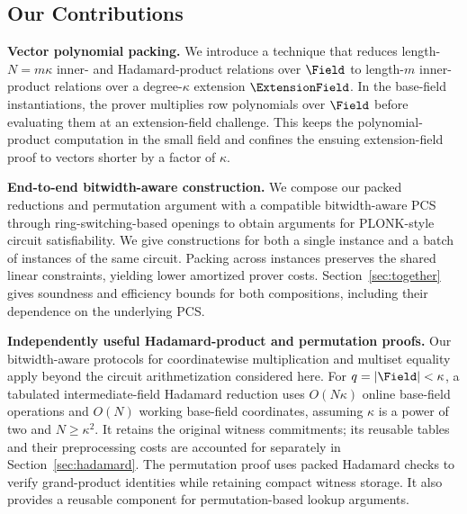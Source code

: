 \subsection{Our Contributions}

\noindent\textbf{Vector polynomial packing.}
    We introduce a technique that reduces length-\(N=m\kappa\)
    inner- and Hadamard-product relations over \(\Field\) to
    length-\(m\) inner-product relations over a degree-\(\kappa\)
    extension \(\ExtensionField\).
    In the base-field instantiations, the prover multiplies row polynomials over \(\Field\) before
    evaluating them at an extension-field challenge.
    This keeps the polynomial-product computation in the small field
    and confines the ensuing extension-field proof to vectors shorter
    by a factor of \(\kappa\).

\medskip \noindent \textbf{End-to-end bitwidth-aware construction.}
    We compose our packed reductions and permutation argument with
    a compatible bitwidth-aware PCS through ring-switching-based
    openings to obtain arguments for PLONK-style circuit satisfiability.
    We give constructions for both a single instance and a batch of
    instances of the same circuit.
    Packing across instances preserves the shared linear constraints,
    yielding lower amortized prover costs.
    Section~\ref{sec:together} gives soundness and efficiency bounds
    for both compositions, including their dependence on the
    underlying PCS.

\medskip\noindent \textbf{Independently useful Hadamard-product and permutation proofs.}
    Our bitwidth-aware protocols for coordinatewise multiplication
    and multiset equality apply beyond the circuit arithmetization
    considered here.
    For \(q=|\Field|<\kappa\), a tabulated intermediate-field
    Hadamard reduction uses \(O(N\kappa)\) online base-field
    operations and \(O(N)\) working base-field coordinates,
    assuming \(\kappa\) is a power of two and \(N\geq\kappa^2\).
    It retains the original witness commitments; its reusable
    tables and their preprocessing costs are accounted for
    separately in Section~\ref{sec:hadamard}.
    The permutation proof uses packed Hadamard checks to verify
    grand-product identities while retaining compact witness storage.
    It also provides a reusable component for permutation-based
    lookup arguments.
